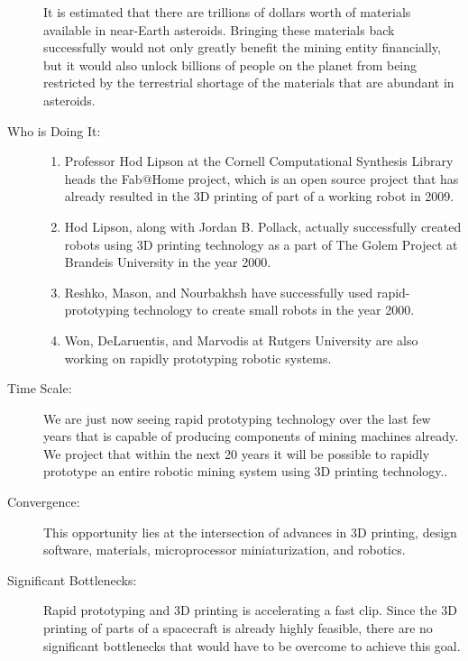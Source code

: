 \begin{description}
It is estimated that there are trillions of dollars worth of materials
available in near-Earth asteroids. Bringing these materials back successfully
would not only greatly benefit the mining entity financially, but
it would also unlock billions of people on the planet from being restricted
by the terrestrial shortage of the materials that are abundant in
asteroids.


\item[Who is Doing It:]

\hfill\begin{enumerate}
\item Professor Hod Lipson at the Cornell Computational Synthesis Library
heads the Fab@Home project, which is an open source project that has
already resulted in the 3D printing of part of a working robot in
2009\cite{fabathome}.
\item Hod Lipson, along with Jordan B. Pollack, actually successfully created
robots using 3D printing technology as a part of The Golem Project
at Brandeis University in the year 2000\cite{golem}.
\item Reshko, Mason, and Nourbakhsh have successfully used rapid-prototyping
technology to create small robots in the year 2000\cite{reshko}.
\item Won, DeLaruentis, and Marvodis at Rutgers University are also working
on rapidly prototyping robotic systems\cite{won}.
\end{enumerate}

\item[Time Scale:]

We are just now seeing rapid prototyping technology over the last
few years that is capable of producing components of mining machines
already. We project that within the next 20 years it will be possible
to rapidly prototype an entire robotic mining system using 3D printing
technology..


\item[Convergence:]

This opportunity lies at the intersection of advances in 3D printing,
design software, materials, microprocessor miniaturization, and robotics.


\item[Significant Bottlenecks:]

Rapid prototyping and 3D printing is accelerating a fast clip. Since
the 3D printing of parts of a spacecraft is already highly feasible,
there are no significant bottlenecks that would have to be overcome
to achieve this goal.
\end{description}
 
